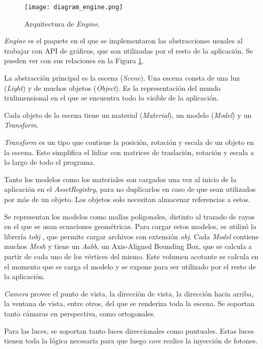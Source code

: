 \begin{figure}[ht]
    \centering
    \texttt{[image: diagram\_engine.png]}
    \caption{Arquitectura de \textit{Engine}.}
    \label{fig:engine_architecture}
\end{figure}

\textit{Engine} es el paquete en el que se implementaron las abstracciones usuales al trabajar con API de gráficos, que son utilizadas por el resto de la aplicación.
Se pueden ver con sus relaciones en la Figura \ref{fig:engine_architecture}.

La abstracción principal es la escena (\textit{Scene}).
Una escena consta de una luz (\textit{Light}) y de muchos objetos (\textit{Object}).
Es la representación del mundo tridimensional en el que se encuentra todo lo visible de la aplicación.

Cada objeto de la escena tiene un material (\textit{Material}), un modelo (\textit{Model}) y un \textit{Transform}.

\textit{Transform} es un tipo que contiene la posición, rotación y escala de un objeto en la escena.
Esto simplifica el lidiar con matrices de traslación, rotación y escala a lo largo de todo el programa.

Tanto los modelos como los materiales son cargados una vez al inicio de la aplicación en el \textit{AssetRegistry}, para no duplicarlos en caso de que sean utilizados por más de un objeto.
Los objetos solo necesitan almacenar referencias a estos.

Se representan los modelos como mallas poligonales, distinto al trazado de rayos en el que se usan ecuaciones geométricas.
Para cargar estos modelos, se utilizó la librería \textit{tobj} \cite{tobj-crate}, que permite cargar archivos con extensión \textit{obj}.
Cada \textit{Model} contiene muchos \textit{Mesh} y tiene un \textit{Aabb}, un Axis-Aligned Bounding Box, que se calcula a partir de cada uno de los vértices del mismo.
Este volumen acotante se calcula en el momento que se carga el modelo y se expone para ser utilizado por el resto de la aplicación.

\textit{Camera} provee el punto de vista, la dirección de vista, la dirección hacia arriba, la ventana de vista, entre otros, del que se renderiza toda la escena.
Se soportan tanto cámaras en perspectiva, como ortogonales.

Para las luces, se soportan tanto luces direccionales como puntuales.
Estas luces tienen toda la lógica necesaria para que luego \textit{core} realice la inyección de fotones.

